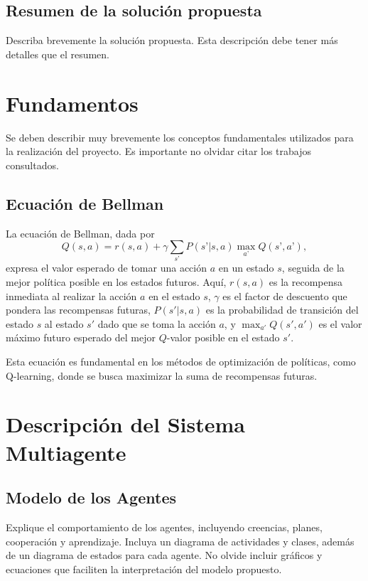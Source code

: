 \documentclass[sjournal]{IEEEtran}
\begin{document}
\subsection{Resumen de la solución propuesta}
Describa brevemente la solución propuesta. Esta descripción debe tener más detalles que el resumen.

\section{Fundamentos}

\noindent
Se deben describir muy brevemente los conceptos fundamentales utilizados para la realización del proyecto. Es importante no olvidar citar los trabajos consultados.

\subsection{Ecuación de Bellman}

La ecuación de Bellman, dada por
\begin{equation}\label{Eq:Bellman}
	Q(s, a) = r(s, a) + \gamma \sum_{s’} P(s’ | s, a) \max_{a’} Q(s’, a’),
\end{equation}
expresa el valor esperado de tomar una acción \(a\) en un estado \(s\), seguida de la mejor política posible en los estados futuros. Aquí, \(r(s, a)\) es la recompensa inmediata al realizar la acción \(a\) en el estado \(s\), \(\gamma\) es el factor de descuento que pondera las recompensas futuras, \(P(s' | s, a)\) es la probabilidad de transición del estado \(s\) al estado \(s'\) dado que se toma la acción \(a\), y \(\max_{a'} Q(s', a')\) es el valor máximo futuro esperado del mejor \(Q\)-valor posible en el estado \(s'\).

Esta ecuación es fundamental en los métodos de optimización de políticas, como Q-learning, donde se busca maximizar la suma de recompensas futuras.


\section{Descripción del Sistema Multiagente}
\subsection{Modelo de los Agentes}
Explique el comportamiento de los agentes, incluyendo creencias, planes, cooperación y aprendizaje. Incluya un diagrama de actividades y clases, además de un diagrama de estados para cada agente. No olvide incluir gráficos y ecuaciones que faciliten la interpretación del modelo propuesto.
\end{document}
